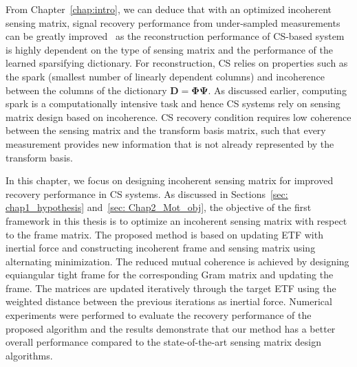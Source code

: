 From Chapter~\ref{chap:intro}, we can deduce that with an optimized incoherent sensing matrix, signal recovery performance from under-sampled measurements can be greatly improved~\cite{Elad} as the reconstruction performance of CS-based system is highly dependent on the type of sensing matrix and the performance of the learned sparsifying dictionary. For reconstruction, CS relies on properties such as the spark (smallest number of linearly dependent columns) and incoherence between the columns of the dictionary $\bm{D} = \bm{\Phi}\bm{\Psi}$. As discussed earlier, computing spark is a computationally intensive task and hence CS systems rely on sensing matrix design based on incoherence. CS recovery condition requires low coherence between the sensing matrix and the transform basis matrix, such that every measurement provides new information that is not already represented by the transform basis. 

In this chapter, we focus on designing incoherent sensing matrix for improved recovery performance in CS systems. As discussed in Sections~\ref{sec: chap1_hypothesis} and~\ref{sec: Chap2_Mot_obj}, the objective of the first framework in this thesis is to optimize an incoherent sensing matrix with respect to the frame matrix. The proposed method is based on updating ETF with inertial force and constructing incoherent frame and sensing matrix using alternating minimization. The reduced mutual coherence is achieved by designing equiangular tight frame for the corresponding Gram matrix and updating the frame. The matrices are updated iteratively through the target ETF using the weighted distance between the previous iterations as inertial force. Numerical experiments were performed to evaluate the recovery performance of the proposed algorithm and the results demonstrate that our method has a better overall performance compared to the state-of-the-art sensing matrix design algorithms.
%

